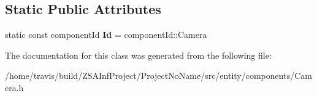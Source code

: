 \subsection*{Static Public Attributes}
\begin{DoxyCompactItemize}
\item 
\hypertarget{classCameraComponent_adf7a08c6a07570dca05839807c63fd53}{static const component\-Id {\bfseries Id} = component\-Id\-::\-Camera}\label{classCameraComponent_adf7a08c6a07570dca05839807c63fd53}

\end{DoxyCompactItemize}


The documentation for this class was generated from the following file\-:\begin{DoxyCompactItemize}
\item 
/home/travis/build/\-Z\-S\-A\-Inf\-Project/\-Project\-No\-Name/src/entity/components/Camera.\-h\end{DoxyCompactItemize}
